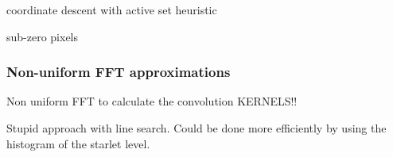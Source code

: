 coordinate descent with active set heuristic


sub-zero pixels

\subsubsection{Non-uniform FFT approximations}
Non uniform FFT to calculate the convolution KERNELS!!


Stupid approach with line search. Could be done more efficiently by using the histogram of the starlet level.

